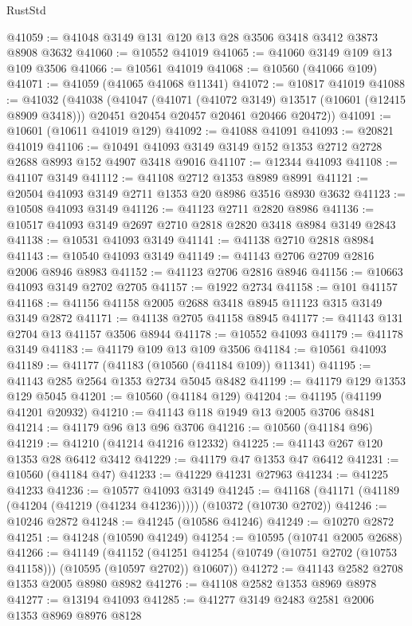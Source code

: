 \begin{lexlean}{RustStd}
\begin{coremodule}
@41059 := @41048 @3149 @131 @120 @13 @28 @3506 @3418 @3412 @3873 @8908 @3632
@41060 := @10552 @41019
@41065 := @41060 @3149 @109 @13 @109 @3506
@41066 := @10561 @41019
@41068 := @10560 (@41066 @109)
@41071 := @41059 (@41065 @41068 @11341)
@41072 := @10817 @41019
@41088 := @41032
    (@41038
      (@41047
        (@41071 (@41072 @3149) @13517 (@10601 (@12415 @8909 @3418)))
        @20451
        @20454
        @20457
        @20461
        @20466
        @20472))
@41091 := @10601 (@10611 @41019 @129)
@41092 := @41088 @41091
@41093 := @20821 @41019
@41106 := @10491 @41093 @3149 @3149 @152 @1353 @2712 @2728 @2688 @8993 @152 @4907 @3418 @9016
@41107 := @12344 @41093
@41108 := @41107 @3149
@41112 := @41108 @2712 @1353 @8989 @8991
@41121 := @20504 @41093 @3149 @2711 @1353 @20 @8986 @3516 @8930 @3632
@41123 := @10508 @41093 @3149
@41126 := @41123 @2711 @2820 @8986
@41136 := @10517 @41093 @3149 @2697 @2710 @2818 @2820 @3418 @8984 @3149 @2843
@41138 := @10531 @41093 @3149
@41141 := @41138 @2710 @2818 @8984
@41143 := @10540 @41093 @3149
@41149 := @41143 @2706 @2709 @2816 @2006 @8946 @8983
@41152 := @41123 @2706 @2816 @8946
@41156 := @10663 @41093 @3149 @2702 @2705
@41157 := @1922 @2734
@41158 := @101 @41157
@41168 := @41156 @41158 @2005 @2688 @3418 @8945 @11123 @315 @3149 @3149 @2872
@41171 := @41138 @2705 @41158 @8945
@41177 := @41143 @131 @2704 @13 @41157 @3506 @8944
@41178 := @10552 @41093
@41179 := @41178 @3149
@41183 := @41179 @109 @13 @109 @3506
@41184 := @10561 @41093
@41189 := @41177 (@41183 (@10560 (@41184 @109)) @11341)
@41195 := @41143 @285 @2564 @1353 @2734 @5045 @8482
@41199 := @41179 @129 @1353 @129 @5045
@41201 := @10560 (@41184 @129)
@41204 := @41195 (@41199 @41201 @20932)
@41210 := @41143 @118 @1949 @13 @2005 @3706 @8481
@41214 := @41179 @96 @13 @96 @3706
@41216 := @10560 (@41184 @96)
@41219 := @41210 (@41214 @41216 @12332)
@41225 := @41143 @267 @120 @1353 @28 @6412 @3412
@41229 := @41179 @47 @1353 @47 @6412
@41231 := @10560 (@41184 @47)
@41233 := @41229 @41231 @27963
@41234 := @41225 @41233
@41236 := @10577 @41093 @3149
@41245 := @41168 (@41171 (@41189 (@41204 (@41219 (@41234 @41236))))) (@10372 (@10730 @2702))
@41246 := @10246 @2872
@41248 := @41245 (@10586 @41246)
@41249 := @10270 @2872
@41251 := @41248 (@10590 @41249)
@41254 := @10595 (@10741 @2005 @2688)
@41266 := @41149
    (@41152 (@41251 @41254 (@10749 (@10751 @2702 (@10753 @41158))) (@10595 (@10597 @2702)) @10607))
@41272 := @41143 @2582 @2708 @1353 @2005 @8980 @8982
@41276 := @41108 @2582 @1353 @8969 @8978
@41277 := @13194 @41093
@41285 := @41277 @3149 @2483 @2581 @2006 @1353 @8969 @8976 @8128

\end{coremodule}
\end{lexlean}
